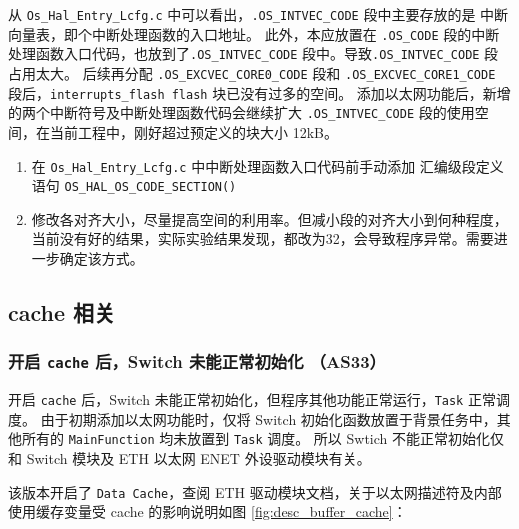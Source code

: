 从 \lstinline{Os_Hal_Entry_Lcfg.c} 中可以看出，\lstinline{.OS_INTVEC_CODE} 段中主要存放的是 中断向量表，即个中断处理函数的入口地址。
此外，本应放置在 \lstinline{.OS_CODE} 段的中断处理函数入口代码，也放到了\lstinline{.OS_INTVEC_CODE} 段中。导致\lstinline{.OS_INTVEC_CODE} 段占用太大。
后续再分配 \lstinline{.OS_EXCVEC_CORE0_CODE} 段和 \lstinline{.OS_EXCVEC_CORE1_CODE} 段后，\lstinline{interrupts_flash flash} 块已没有过多的空间。
添加以太网功能后，新增的两个中断符号及中断处理函数代码会继续扩大 \lstinline{.OS_INTVEC_CODE} 段的使用空间，在当前工程中，刚好超过预定义的块大小 12kB。

\begin{definition}[解决方案]
    \begin{enumerate}
        \item 在 \lstinline{Os_Hal_Entry_Lcfg.c} 中中断处理函数入口代码前手动添加 汇编级段定义语句 \lstinline{OS_HAL_OS_CODE_SECTION()}
        \item 修改各对齐大小，尽量提高空间的利用率。但减小段的对齐大小到何种程度，当前没有好的结果，实际实验结果发现，都改为32，会导致程序异常。需要进一步确定该方式。
    \end{enumerate}
\end{definition}

\subsection{cache 相关}
\subsubsection{开启 \lstinline{cache} 后，Switch 未能正常初始化 （AS33）}\label{subsubsec:desc_buffer_cache}

开启  \lstinline{cache} 后，Switch 未能正常初始化，但程序其他功能正常运行，\lstinline{Task} 正常调度。
由于初期添加以太网功能时，仅将 Switch 初始化函数放置于背景任务中，其他所有的 \lstinline{MainFunction} 均未放置到 \lstinline{Task} 调度。
所以 Swtich 不能正常初始化仅和 Switch 模块及 ETH 以太网 ENET 外设驱动模块有关。

该版本开启了 \lstinline{Data Cache}，查阅 ETH 驱动模块文档，关于以太网描述符及内部使用缓存变量受 cache 的影响说明如图 \ref{fig:desc_buffer_cache}：

